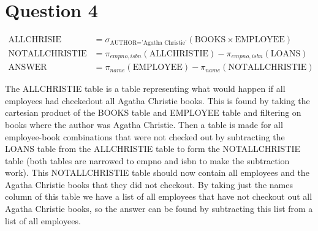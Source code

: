 \documentclass{article}
\begin{document}
\section*{Question 4} %
\label{sec:question_4}
\begin{align*}
    \text{ALLCHRISIE} &= \sigma_{\text{AUTHOR='Agatha Christie'}}(\text{BOOKS}\times \text{EMPLOYEE})\\
    \text{NOTALLCHRISTIE} &= \pi_{empno,isbn}(\text{ALLCHRISTIE}) - \pi_{empno,isbn}(\text{LOANS})\\
    \text{ANSWER} &= \pi_{name}(\text{EMPLOYEE}) - \pi_{name}(\text{NOTALLCHRISTIE})
\end{align*}

The ALLCHRISTIE table is a table representing what would happen if all employees had checkedout all Agatha Christie books. This is found by taking the cartesian product of the BOOKS table and EMPLOYEE table and filtering on books where the author was Agatha Christie. Then a table is made for all employee-book combinations that were not checked out by subtracting the LOANS table from the ALLCHRISTIE table to form the NOTALLCHRISTIE table (both tables are narrowed to empno and isbn to make the subtraction work). This NOTALLCHRISTIE table should now contain all employees and the Agatha Christie books that they did not checkout. By taking just the names column of this table we have a list of all employees that have not checkout out all Agatha Christie books, so the answer can be found by subtracting this list from a list of all employees.
\end{document}
